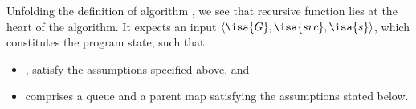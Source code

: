 \begin{isabellebody}
\begin{isamarkuptext}
\end{isamarkuptext}\isamarkuptrue%
%
\isadelimdocument
%
\endisadelimdocument
%
\isatagdocument
%
\isamarkuptrue%
%
\endisatagdocument
{\isafolddocument}%
%
\isadelimdocument
%
\endisadelimdocument
%
\begin{isamarkuptext}%
Unfolding the definition of algorithm , we see that recursive function
 lies at the heart of the algorithm. It expects an input
$\langle \isa{G},\isa{src},\isa{s}\rangle$, which constitutes the program state, such that

%
\begin{itemize}%
\item {},  satisfy the assumptions specified above, and

\item {} comprises a queue and a parent map satisfying the assumptions stated below.%
\end{itemize}



\end{isamarkuptext}
\end{isabellebody}
